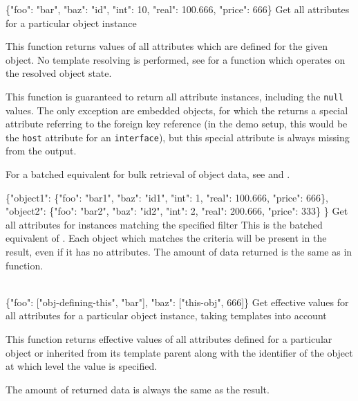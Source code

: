 \documentclass{article}
\begin{document}
    {\{"foo": "bar", "baz": "id", "int": 10, "real": 100.666, "price": 666\}}
    {Get all attributes for a particular object instance}
    {This function returns values of all attributes which are defined for the given object.  No template resolving is
    performed, see  for a function which operates on the resolved object state.

    This function is guaranteed to return all attribute instances, including the {\tt null} values.  The only exception are
    embedded objects, for which the  returns a special attribute referring to the foreign
    key reference (in the demo setup, this would be the {\tt host} attribute for an {\tt interface}), but this special
    attribute is always missing from the  output.

    For a batched equivalent for bulk retrieval of object data, see  and
    .  \deskaUnsortedRes
    }

    {\{"object1": \{"foo": "bar1", "baz": "id1", "int": 1, "real": 100.666, "price": 666\}, \\
       "object2": \{"foo": "bar2", "baz": "id2", "int": 2, "real": 200.666, "price": 333\}
      \}}
    {Get all attributes for instances matching the specified filter}
    {This is the batched equivalent of .  Each object which matches the criteria will be
    present in the result, even if it has no attributes.  The amount of data returned is the same as in
     function.  \deskaUnsortedRes}

    {\\ \{"foo": ["obj-defining-this", "bar"], "baz": ["this-obj", 666]\}}
    {Get effective values for all attributes for a particular object instance, taking templates into account}
    {This function returns effective values of all attributes defined for a particular object or inherited from its
    template parent along with the identifier of the object at which level the value is specified.

    The amount of returned data is always the same as the  result.  \deskaUnsortedRes}
\end{document}
